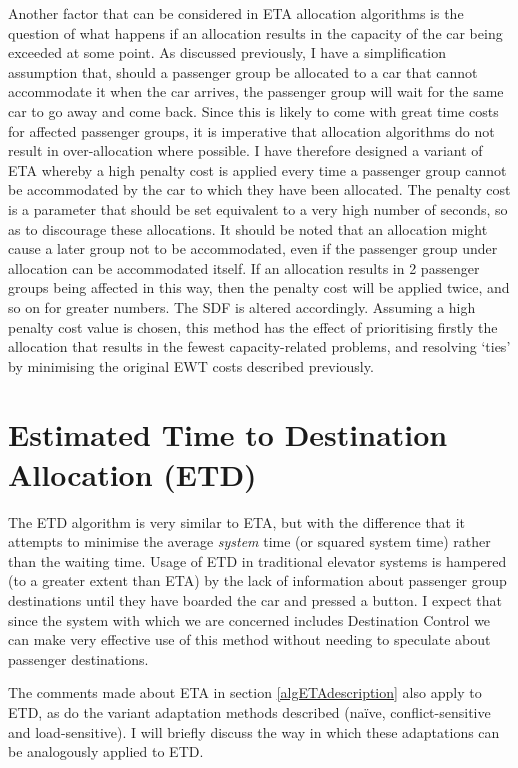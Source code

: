\documentclass{UoYCSproject}
\begin{document}
Another factor that can be considered in ETA allocation algorithms is the question of what happens if an allocation results in the capacity of the car being exceeded at some point.  As discussed previously, I have a simplification assumption that, should a passenger group be allocated to a car that cannot accommodate it when the car arrives, the passenger group will wait for the same car to go away and come back.  Since this is likely to come with great time costs for affected passenger groups, it is imperative that allocation algorithms do not result in over-allocation where possible.  I have therefore designed a variant of ETA whereby a high penalty cost is applied every time a passenger group cannot be accommodated by the car to which they have been allocated.  The penalty cost is a parameter that should be set equivalent to a very high number of seconds, so as to discourage these allocations.  It should be noted that an allocation might cause a later group not to be accommodated, even if the passenger group under allocation can be accommodated itself.  If an allocation results in 2 passenger groups being affected in this way, then the penalty cost will be applied twice, and so on for greater numbers.  The SDF is altered accordingly.  Assuming a high penalty cost value is chosen, this method has the effect of prioritising firstly the allocation that results in the fewest capacity-related problems, and resolving `ties' by minimising the original EWT costs described previously.

\section{Estimated Time to Destination Allocation (ETD)}
\label{algETDdescription}

The ETD algorithm is very similar to ETA, but with the difference that it attempts to minimise the average \textit{system} time (or squared system time) rather than the waiting time.  Usage of ETD in traditional elevator systems is hampered (to a greater extent than ETA) by the lack of information about passenger group destinations until they have boarded the car and pressed a button.  I expect that since the system with which we are concerned includes Destination Control we can make very effective use of this method without needing to speculate about passenger destinations.

The comments made about ETA in section \ref{algETAdescription} also apply to ETD, as do the variant adaptation methods described (na\"{i}ve, conflict-sensitive and load-sensitive).  I will briefly discuss the way in which these adaptations can be analogously applied to ETD.
\end{document}
